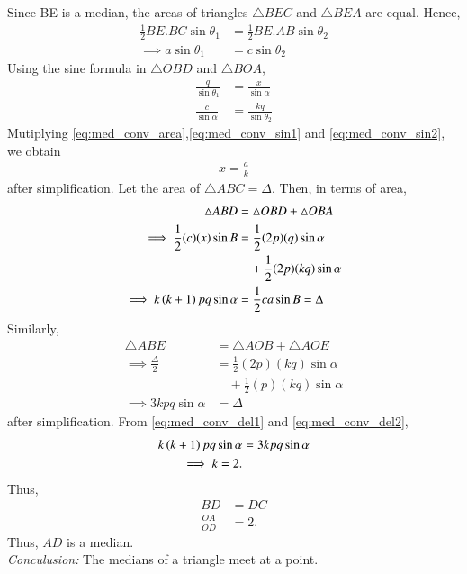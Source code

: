 \proof Since BE is a median, the areas of  triangles  $\triangle BEC$ and $\triangle BEA$ are equal. Hence,
\begin{align}
\frac{1}{2}BE.BC\sin \theta_1 &= \frac{1}{2}BE.AB\sin \theta_2
\\
\implies a\sin \theta_1 &= c\sin \theta_2
\label{eq:med_conv_area}
\end{align}
%
Using the sine formula in $\triangle OBD$ and $\triangle BOA$,
\begin{align}
\label{eq:med_conv_sin1}
\frac{q}{\sin \theta_1} &= \frac{x}{\sin \alpha} 
\\
\frac{c}{\sin \alpha} &= \frac{kq}{\sin \theta_2}
\label{eq:med_conv_sin2}
\end{align}
Mutiplying \eqref{eq:med_conv_area},\eqref{eq:med_conv_sin1}
and \eqref{eq:med_conv_sin2},
%
we obtain
\begin{align}
x = \frac{a}{k}
\label{eq:med_conv_ak}
\end{align}
after simplification.
Let the area of $\triangle ABC = \Delta$. Then, in terms of area,
\begin{align}
\triangle ABD &= \triangle OBD + \triangle OBA
\\
\implies \frac{1}{2}(c)(x)\sin B &=\frac{1}{2}(2p)(q)\sin \alpha 
\\
&\quad + \frac{1}{2}(2p)(kq)\sin \alpha
\\
\implies k\left(k+1\right)pq \sin \alpha  &= \frac{1}{2}ca \sin B = \Delta
\label{eq:med_conv_del1}
\end{align}
%
Similarly,
\begin{align}
\triangle ABE &= \triangle AOB + \triangle AOE
\\
\implies \frac{\Delta}{2} &=\frac{1}{2}(2p)(kq)\sin \alpha 
\\
&\quad + \frac{1}{2}(p)(kq)\sin \alpha
\\
\implies 3kpq \sin \alpha  &=  \Delta
\label{eq:med_conv_del2}
\end{align}
%
after simplification. From \eqref{eq:med_conv_del1}
and \eqref{eq:med_conv_del2},
%
\begin{align}
k\left(k+1\right)pq \sin \alpha &=  3kpq \sin \alpha  
\\
\implies k = 2.
\end{align}
Thus, 
\begin{align}
BD &= DC
\\
\frac{OA}{OD} &= 2.
\end{align}
Thus, $AD$ is a median.
\\
{\em Conculusion:} The medians of a triangle meet at a point.

